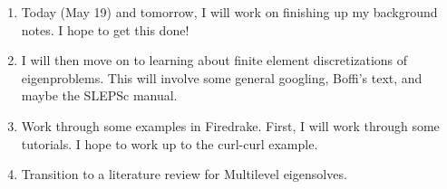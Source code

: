 \documentclass[12pt,a4paper]{article}
\begin{document}
\begin{enumerate}
    \item Today (May 19) and tomorrow, I will work on finishing up my background notes. I hope to get this done!
    \item I will then move on to learning about finite element discretizations of eigenproblems. This will involve some general googling, Boffi's text, and maybe the SLEPSc manual. 
    \item Work through some examples in Firedrake. First, I will work through some tutorials. I hope to work up to the curl-curl example. 
    \item Transition to a literature review for Multilevel eigensolves.
\end{enumerate}
\end{document}
